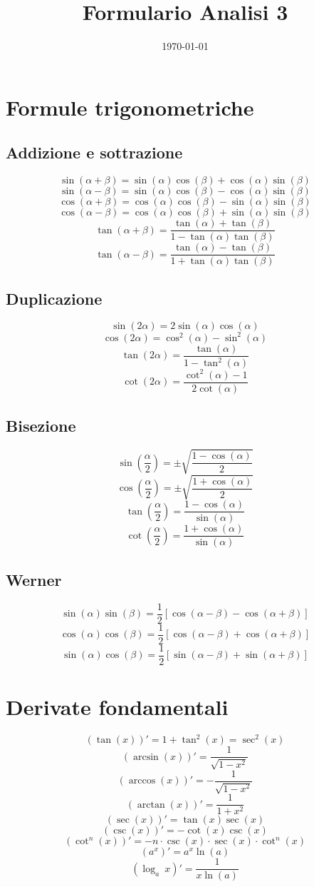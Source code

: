 \documentclass[a4paper,portrait,columns=3,5pt]{cheatsheet}
\title{Formulario Analisi 3}
\author{}
\date{\today}
\begin{document}

\section{Formule trigonometriche}
\subsection{Addizione e sottrazione}
$$\sin (\alpha + \beta) = \sin(\alpha) \cos(\beta) + \cos(\alpha)\sin(\beta)$$
$$\sin(\alpha - \beta) = \sin(\alpha) \cos(\beta) - \cos(\alpha)\sin(\beta)$$
$$\cos(\alpha + \beta) = \cos(\alpha) \cos(\beta) - \sin(\alpha) \sin(\beta)$$
$$\cos(\alpha - \beta) = \cos(\alpha) \cos(\beta) + \sin(\alpha) \sin(\beta)$$
$$\tan(\alpha + \beta) = \frac{\tan(\alpha) + \tan(\beta)}{1 - \tan(\alpha)\tan(\beta)}$$
$$\tan(\alpha - \beta) = \frac{\tan(\alpha) - \tan(\beta)}{1 + \tan(\alpha)\tan(\beta)}$$
\subsection{Duplicazione}
$$\sin(2\alpha) = 2\sin(\alpha)\cos(\alpha)$$
$$\cos(2\alpha) = \cos^2 (\alpha) - \sin^2 (\alpha)$$
$$\tan(2\alpha) = \frac{\tan(\alpha)}{1 - \tan^2(\alpha)}$$
$$\cot(2\alpha) = \frac{\cot^2(\alpha) - 1}{2\cot(\alpha)}$$
\subsection{Bisezione}
$$\sin\left(\frac{\alpha}{2}\right) = \pm \sqrt{\frac{1 - \cos(\alpha)}{2}}$$
$$\cos\left(\frac{\alpha}{2}\right) = \pm \sqrt{\frac{1 + \cos(\alpha)}{2}}$$
$$\tan\left(\frac{\alpha}{2}\right) = {\frac{1 - \cos(\alpha)}{\sin(\alpha)}}$$
$$\cot\left(\frac{\alpha}{2}\right) = {\frac{1 + \cos(\alpha)}{\sin(\alpha)}}$$
\subsection{Werner}
$$\sin(\alpha)\sin(\beta) = \frac{1}{2} \left[\cos(\alpha - \beta) - \cos(\alpha + \beta)\right]$$
$$\cos(\alpha)\cos(\beta) = \frac{1}{2} \left[\cos(\alpha - \beta) + \cos(\alpha + \beta)\right]$$
$$\sin(\alpha)\cos(\beta) = \frac{1}{2} \left[\sin(\alpha - \beta) + \sin(\alpha + \beta)\right]$$

\section{Derivate fondamentali}
$$ (\tan(x))' = 1 + \tan^2(x) = \sec^2(x)$$
$$ (\arcsin(x))' = \frac{1}{\sqrt{1 - x^2}}$$
$$ (\arccos(x))' = - \frac{1}{\sqrt{1 - x^2}}$$
$$ (\arctan(x))' = \frac{1}{1 + x^2}$$
$$ (\sec(x))' = \tan(x)\sec(x)$$
$$ (\csc(x))' = -\cot(x)\csc(x)$$
$$ (\cot^n(x))' = - n \cdot \csc(x) \cdot \sec(x) \cdot \cot^n (x)$$
$$ (a^x)' = a^x \ln(a)$$
$$ (\log_a~x )' = \frac{1}{x\ln(a)}$$
\end{document}
